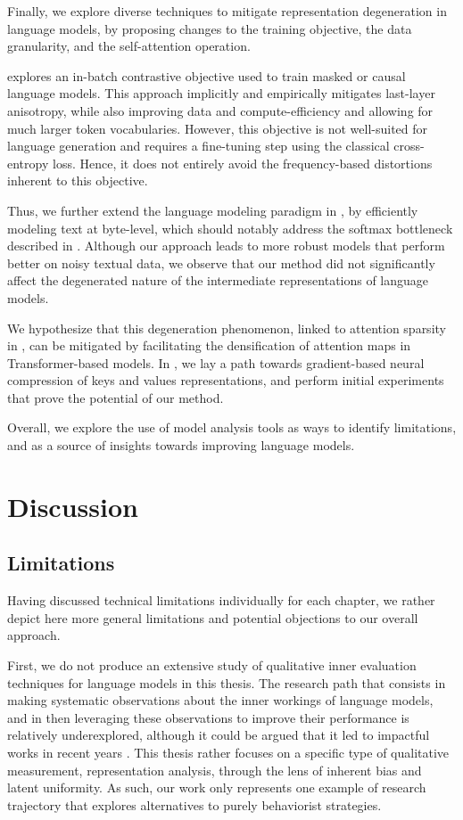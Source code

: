 Finally, we explore diverse techniques to mitigate representation degeneration in language models, by proposing changes to the training objective, the data granularity, and the self-attention operation.

 explores an in-batch contrastive objective used to train masked or causal language models. This approach implicitly and empirically mitigates last-layer anisotropy, while also improving data and compute-efficiency and allowing for much larger token vocabularies. However, this objective is not well-suited for language generation and requires a fine-tuning step using the classical cross-entropy loss. Hence, it does not entirely avoid the frequency-based distortions inherent to this objective.

Thus, we further extend the language modeling paradigm in , by efficiently modeling text at byte-level, which should notably address the softmax bottleneck described in . Although our approach leads to more robust models that perform better on noisy textual data, we observe that our method did not significantly affect the degenerated nature of the intermediate representations of language models.

We hypothesize that this degeneration phenomenon, linked to attention sparsity in , can be mitigated by facilitating the densification of attention maps in Transformer-based models. In , we lay a path towards gradient-based neural compression of keys and values representations, and perform initial experiments that prove the potential of our method.

Overall, we explore the use of model analysis tools as ways to identify limitations, and as a source of insights towards improving language models.

\section{Discussion}
\subsection{Limitations}
Having discussed technical limitations individually for each chapter, we rather depict here more general limitations and potential objections to our overall approach.

First, we do not produce an extensive study of qualitative inner evaluation techniques for language models in this thesis. The research path that consists in making systematic observations about the inner workings of language models, and in then leveraging these observations to improve their performance is relatively underexplored, although it could be argued that it led to impactful works in recent years \citep{hu2022lora,xiao2024efficient}. This thesis rather focuses on a specific type of qualitative measurement, representation analysis, through the lens of inherent bias and latent uniformity. As such, our work only represents one example of research trajectory that explores alternatives to purely behaviorist strategies.

